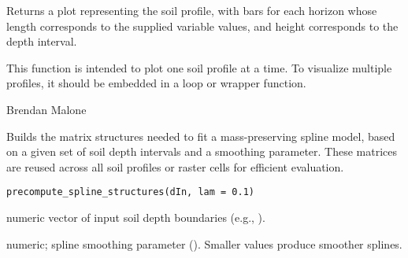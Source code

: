 \documentclass[a4paper]{book}
\begin{document}
%
\begin{Value}
Returns a plot representing the soil profile, with bars for each horizon whose length corresponds to the supplied variable values, and height corresponds to the depth interval.
\end{Value}
%
\begin{Note}
This function is intended to plot one soil profile at a time. To visualize multiple profiles, it should be embedded in a loop or wrapper function.
\end{Note}
%
\begin{Author}
Brendan Malone
\end{Author}
%
\begin{Examples}
\end{Examples}
%
\begin{Description}
Builds the matrix structures needed to fit a mass-preserving spline model, based on a given set of soil depth intervals and a smoothing parameter.
These matrices are reused across all soil profiles or raster cells for efficient evaluation.
\end{Description}
%
\begin{Usage}
\begin{verbatim}
precompute_spline_structures(dIn, lam = 0.1)
\end{verbatim}
\end{Usage}
%
\begin{Arguments}
\begin{ldescription}
\item[\code{dIn}] numeric vector of input soil depth boundaries (e.g., ).
\item[\code{lam}] numeric; spline smoothing parameter (\eqn{\lambda}{}). Smaller values produce smoother splines.
\end{ldescription}
\end{Arguments}
%
\end{document}
